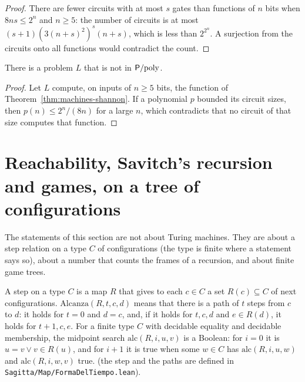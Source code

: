 \begin{proof}
  \leanok
  There are fewer circuits with at most $s$ gates than functions of $n$ bits when $8ns \le 2^n$ and
  $n \ge 5$: the number of circuits is at most $(s + 1)(3(n+s)^2)^s (n + s)$, which is less than $2^{2^n}$.
  A surjection from the circuits onto all functions would contradict the count.
\end{proof}

\begin{theorem}
  \label{thm:machines-outside-ppoly}
  \leanok
  There is a problem $L$ that is not in $\mathsf{P}/\mathrm{poly}$.
\end{theorem}

\begin{proof}
  \leanok
  Let $L$ compute, on inputs of $n \ge 5$ bits, the function of Theorem~\ref{thm:machines-shannon}. If a
  polynomial $p$ bounded its circuit sizes, then $p(n) \le 2^n / (8n)$ for a large $n$, which contradicts that
  no circuit of that size computes that function.
\end{proof}

\section{Reachability, Savitch's recursion and games, on a tree of configurations}
\label{sec:machines-savitch}

The statements of this section are not about Turing machines. They are about a step relation on a type $C$ of
configurations (the type is finite where a statement says so), about a number that counts the frames of a
recursion, and about finite game trees.

\begin{definition}
  \label{def:machines-config-tree}
  \leanok
  A step on a type $C$ is a map $R$ that gives to each $c \in C$ a set $R(c) \subseteq C$ of next
  configurations. $\mathrm{Alcanza}(R, t, c, d)$ means that there is a path of $t$ steps from $c$ to $d$: it
  holds for $t = 0$ and $d = c$, and, if it holds for $t, c, d$ and $e \in R(d)$, it holds for $t + 1, c, e$.
  For a finite type $C$ with decidable equality and decidable membership, the midpoint search
  $\mathrm{alc}(R, i, u, v)$ is a Boolean: for $i = 0$ it is $u = v \lor v \in R(u)$, and for $i + 1$ it is
  true when some $w \in C$ has $\mathrm{alc}(R, i, u, w)$ and $\mathrm{alc}(R, i, w, v)$ true.
  \own{}
  \infrastructure{}
  (the step and the paths are defined in \texttt{Sagitta/Map/FormaDelTiempo.lean}).
\end{definition}

